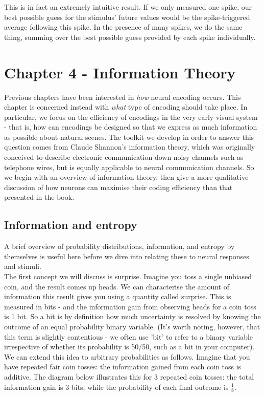 \documentclass{article}
\begin{document}
This is in fact an extremely intuitive result. If we only measured one spike, our best possible guess for the stimulus' future values would be the spike-triggered average following this spike. In the presence of many spikes, we do the same thing, summing over the best possible guess provided by each spike individually.

\section{Chapter 4 - Information Theory}

Previous chapters have been interested in \textit{how} neural encoding occurs. This chapter is concerned instead with \textit{what} type of encoding should take place. In particular, we focus on the efficiency of encodings in the very early visual system - that is, how can encodings be designed so that we express as much information as possible about natural scenes. The toolkit we develop in order to answer this question comes from Claude Shannon's information theory, which was originally conceived to describe electronic communication down noisy channels such as telephone wires, but is equally applicable to neural communication channels. So we begin with an overview of information theory, then give a more qualitative discussion of how neurons can maximise their coding efficiency than that presented in the book.

\subsection{Information and entropy}

A brief overview of probability distributions, information, and entropy by themselves is useful here before we dive into relating these to neural responses and stimuli.\\

The first concept we will discuss is surprise. Imagine you toss a single unbiased coin, and the result comes up heads. We can characterise the amount of information this result gives you using a quantity called surprise. This is measured in bits - and the information gain from observing heads for a coin toss is 1 bit. So a bit is by definition how much uncertainty is resolved by knowing the outcome of an equal probability binary variable. (It's worth noting, however, that this term is slightly contentious - we often use 'bit' to refer to a binary variable irrespective of whether its probability is 50/50, such as a bit in your computer). We can extend this idea to arbitrary probabilities as follows. Imagine that you have repeated fair coin tosses: the information gained from each coin toss is additive. The diagram below illustrates this for 3 repeated coin tosses: the total information gain is 3 bits, while the probability of each final outcome is $\frac{1}{8}$.
\end{document}
